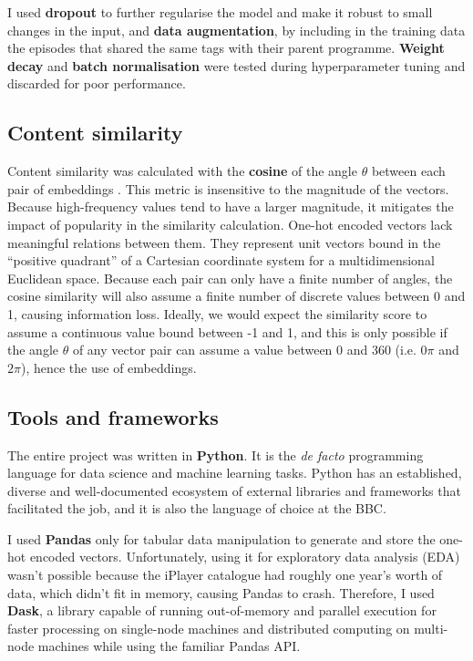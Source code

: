 I used \textbf{dropout} to further regularise the model and make it robust to small changes in the input,
and \textbf{data augmentation}, by including in the training data the episodes that shared the same tags with their
parent programme. \textbf{Weight decay} and \textbf{batch normalisation} were tested during hyperparameter tuning and discarded for poor performance.

\subsection{Content similarity}

Content similarity was calculated with the \textbf{cosine} of the angle $\theta$ between each pair of embeddings \cite{GoogleForDevelopers:EmbeddingSimilarity}.
This metric is insensitive to the magnitude of the vectors. Because high-frequency values tend to have a larger magnitude,
it mitigates the impact of popularity in the similarity calculation.
One-hot encoded vectors lack meaningful relations between them.
They represent unit vectors bound in the ``positive quadrant'' of a Cartesian coordinate system for a multidimensional Euclidean space.
Because each pair can only have a finite number of angles,
the cosine similarity will also assume a finite number of discrete values between 0 and 1, causing information
loss. Ideally, we would expect the similarity score to assume a continuous value bound between -1 and 1, and this
is only possible if the angle $\theta$ of any vector pair can assume a value between 0 and 360 (i.e. $0\pi$ and $2\pi$), hence
the use of embeddings.

\subsection{Tools and frameworks}

The entire project was written in \textbf{Python}. It is the \textit{de facto} programming language for data science
and machine learning tasks. Python has an established, diverse and well-documented ecosystem of external libraries
and frameworks that facilitated the job, and it is also the language of choice at the BBC.

I used \textbf{Pandas} only for tabular data manipulation to generate and store the one-hot encoded vectors.
Unfortunately, using it for exploratory data analysis (EDA) wasn't possible because the iPlayer catalogue
had roughly one year's worth of data, which didn't fit in memory, causing Pandas to crash.
Therefore, I used \textbf{Dask}, a library capable of running out-of-memory and parallel execution
for faster processing on single-node machines and distributed computing on multi-node machines
while using the familiar Pandas API.

